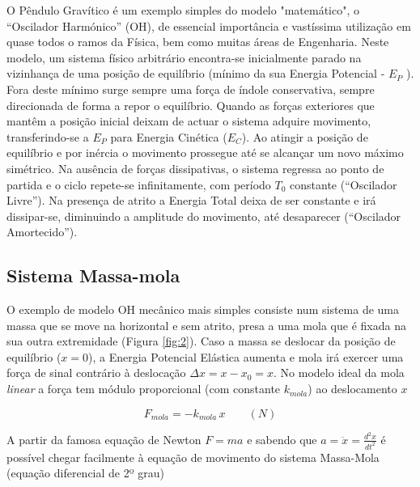 \documentclass[a4paper,twoside,12pt]{article}      %
\begin{document}
O Pêndulo Gravítico é um exemplo simples do modelo "matemático", o ``Oscilador Harmónico'' (OH), de essencial importância e  vastíssima utilização em quase todos o ramos da Física, bem como muitas áreas de Engenharia. Neste modelo, um sistema físico arbitrário encontra-se inicialmente parado na vizinhança de uma posição de equilíbrio (mínimo da sua Energia Potencial - $E_P$ ). Fora deste mínimo surge sempre uma força de índole conservativa, sempre direcionada de forma a repor o equilíbrio. 
Quando as forças exteriores que mantêm a posição inicial deixam de actuar o sistema adquire movimento, 
transferindo-se a $E_P$ para Energia Cinética ($E_C$). 
Ao atingir a posição de equilíbrio e por inércia o movimento prossegue até se alcançar um novo máximo simétrico. Na ausência de forças dissipativas, o sistema regressa  ao ponto de partida e o ciclo repete-se infinitamente, com período $T_0$ constante (``Oscilador Livre''). Na presença de atrito a Energia Total deixa de ser constante e irá dissipar-se, diminuindo a amplitude do movimento, até desaparecer (``Oscilador Amortecido'').

\subsection{\sf Sistema Massa-mola}
O exemplo de modelo OH mecânico mais simples  consiste num sistema de uma massa que se move na horizontal e sem atrito,  presa a uma mola  que é fixada na sua outra extremidade (Figura \ref{fig:2}). Caso a massa se deslocar da posição de equilíbrio ($x =0$), a Energia Potencial Elástica aumenta e mola irá exercer uma força de sinal contrário à deslocação $\Delta x = x - x_0 = x$. No modelo ideal da mola \emph{linear}  a força tem  módulo proporcional (com constante $k_{mola}$) ao deslocamento $x$ 

\begin{equation}
F_{mola} = - k_{mola} \, x \qquad (N)
\end{equation}

A partir da famosa equação de Newton $F=m a$ e sabendo que $ a = \ddot{x}= \frac{d^2 x}{dt^2}$ é possível chegar facilmente  à equação de movimento do sistema Massa-Mola (equação diferencial de 2º grau)
\end{document}
